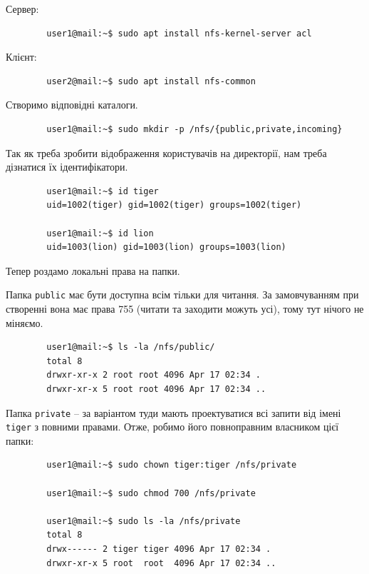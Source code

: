 \documentclass[14pt, a4paper]{extreport}
\begin{document}
	Сервер: \sideat{[VM 1]}
	
	\begin{verbatim}
		user1@mail:~$ sudo apt install nfs-kernel-server acl
	\end{verbatim}
	
	Клієнт: \sideat{[VM 2]}
	
	\begin{verbatim}
		user2@mail:~$ sudo apt install nfs-common
	\end{verbatim}
	
	Створимо відповідні каталоги. \sideat{[VM 1]}
	
	\begin{verbatim}
		user1@mail:~$ sudo mkdir -p /nfs/{public,private,incoming}
	\end{verbatim}
	
	Так як треба зробити відображення користувачів на директорії, нам треба дізнатися їх ідентифікатори. \sideat{[VM 1]}
	
	\begin{verbatim}
		user1@mail:~$ id tiger
		uid=1002(tiger) gid=1002(tiger) groups=1002(tiger)
		
		user1@mail:~$ id lion
		uid=1003(lion) gid=1003(lion) groups=1003(lion)
	\end{verbatim}
	
	\pagebreak
	
	Тепер роздамо локальні права на папки.
	
	Папка \texttt{public} має бути доступна всім тільки для читання. За замовчуванням при створенні вона має права 755 (читати та заходити можуть усі), тому тут нічого не міняємо. \sideat{[VM 1]}

	\begin{verbatim}
		user1@mail:~$ ls -la /nfs/public/
		total 8
		drwxr-xr-x 2 root root 4096 Apr 17 02:34 .
		drwxr-xr-x 5 root root 4096 Apr 17 02:34 ..
	\end{verbatim}
	
	Папка \texttt{private} -- за варіантом туди мають проектуватися всі запити від імені \texttt{tiger} з повними правами. Отже, робимо його повноправним власником цієї папки: \sideat{[VM 1]}
	
	\begin{verbatim}
		user1@mail:~$ sudo chown tiger:tiger /nfs/private
		
		user1@mail:~$ sudo chmod 700 /nfs/private
		
		user1@mail:~$ sudo ls -la /nfs/private
		total 8
		drwx------ 2 tiger tiger 4096 Apr 17 02:34 .
		drwxr-xr-x 5 root  root  4096 Apr 17 02:34 ..
	\end{verbatim}
	
\end{document}
